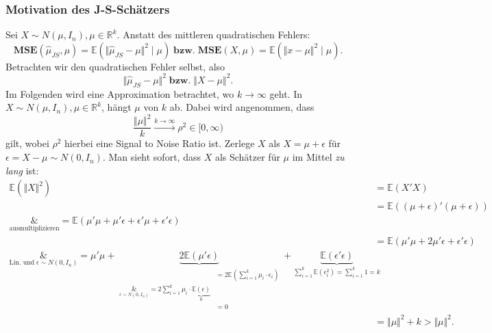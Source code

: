 \documentclass[10pt]{article}
\newcommand{\IR}{\mathbb{R}} %
\newcommand{\EW}{\mathbb{E}} %
\newcommand{\MSE}{\textbf{MSE}} %
\newcommand{\JSEM}{\hat{\mu}_{JS}} %
\begin{document}
	\subsubsection{Motivation des J-S-Schätzers}
	Sei $X \sim N(\mu, I_n), \mu \in \IR^k$. Anstatt des mittleren quadratischen Fehlers:
	\begin{equation*}
		\MSE(\hat{\mu}_{JS}, \mu) = \EW(\Vert \JSEM - \mu \Vert^2 \mid \mu) \; \textbf{bzw.} \; \MSE(X, \mu) = \EW( \Vert x - \mu \Vert^2 \mid \mu).
	\end{equation*}
	Betrachten wir den quadratischen Fehler selbst, also
	\begin{equation*}
		\Vert \JSEM - \mu \Vert^2 \; \textbf{bzw.} \; \Vert X - \mu \Vert^2.
	\end{equation*}
	Im Folgenden wird eine Approximation betrachtet, wo $k \rightarrow \infty$ geht. In $X \sim N(\mu, I_n), \mu \in \IR^k$, hängt $\mu$ von $k$ ab. Dabei wird angenommen, dass
	\begin{equation*}
		\frac{\Vert \mu \Vert^2}{k} \overset{k \rightarrow \infty}{\longrightarrow} \rho^2 \in [0, \infty) 
	\end{equation*}
	gilt, wobei $\rho^2$ hierbei eine Signal to Noise Ratio ist.
	Zerlege $X$ als $X = \mu + \epsilon$ für $\epsilon = X- \mu \sim N(0, I_n)$.
	Man sieht sofort, dass $X$ als Schätzer für $\mu$ im Mittel \textit{zu lang} ist:
	\begin{equation*}
		\begin{split}
			\EW(\Vert X \Vert^2) &= \EW(X'X) \\
			&= \EW((\mu + \epsilon)'(\mu + \epsilon)) \\
			\underset{\text{ausmultiplizieren}}&{=} \EW(\mu' \mu + \mu' \epsilon + \epsilon' \mu + \epsilon' \epsilon) \\
			&= \EW(\mu'\mu + 2\mu'\epsilon + \epsilon'\epsilon)\\
			\underset{\text{Lin. und}\; \epsilon \sim N(0,I_n)}&{=} \mu' \mu + \underbrace{2\EW(\mu'\epsilon)}_{\begin{split}
					&= 2 \EW(\sum_{i=1}^{k} \mu_i \cdot \epsilon_i)\\
					\underset{\epsilon \sim N(0,I_n)}&{=} 2 \sum_{i = 1}^{k} \mu_i \cdot \underbrace{\EW(\epsilon)}_{0}\\
					&=0
				\end{split}} + \underbrace{\EW(\epsilon' \epsilon)}_{\sum_{i=1}^{k}\EW(\epsilon_i^2)= \sum_{i = 1}^{k} 1 = k}\\
			&= \Vert \mu \Vert^2 +k > \Vert \mu \Vert^2.
		\end{split}
	\end{equation*}
	
\end{document}
